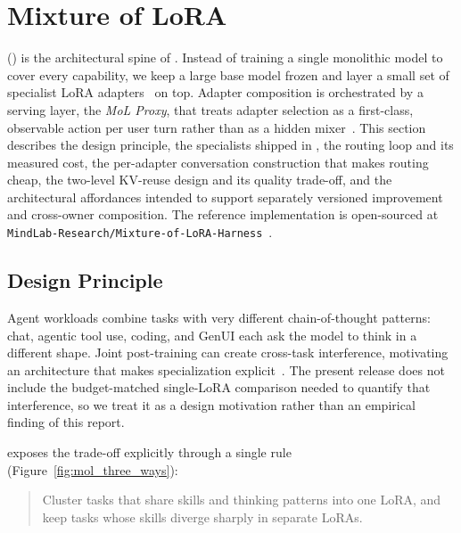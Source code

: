 \section{Mixture of LoRA}
\label{sec:mol}

\mol{} (\molshort) is the architectural spine of \macaron{}. Instead of training a single monolithic model to cover every capability, we keep a large base model frozen and layer a small set of specialist LoRA adapters~\citep{lora2022,lora_without_regret_2025,zhou2025bslora} on top. Adapter composition is orchestrated by a serving layer, the \emph{MoL Proxy}, that treats adapter selection as a first-class, observable action per user turn rather than as a hidden mixer~\citep{mol_harness2026}. This section describes the design principle, the specialists shipped in \venti, the routing loop and its measured cost, the per-adapter conversation construction that makes routing cheap, the two-level KV-reuse design and its quality trade-off, and the architectural affordances intended to support separately versioned improvement and cross-owner composition. The reference implementation is open-sourced at \texttt{MindLab-Research/Mixture-of-LoRA-Harness}~\citep{mol_harness2026}.

\subsection{Design Principle}
\label{sec:mol_principle}

Agent workloads combine tasks with very different chain-of-thought patterns: chat, agentic tool use, coding, and GenUI each ask the model to think in a different shape. Joint post-training can create cross-task interference, motivating an architecture that makes specialization explicit~\citep{macaron_v1_preview2026}. The present release does not include the budget-matched single-LoRA comparison needed to quantify that interference, so we treat it as a design motivation rather than an empirical finding of this report.

\molshort{} exposes the trade-off explicitly through a single rule~\citep{macaron_v1_preview2026} (Figure~\ref{fig:mol_three_ways}):

\begin{quote}
Cluster tasks that share skills and thinking patterns into one LoRA, and keep tasks whose skills diverge sharply in separate LoRAs.
\end{quote}

